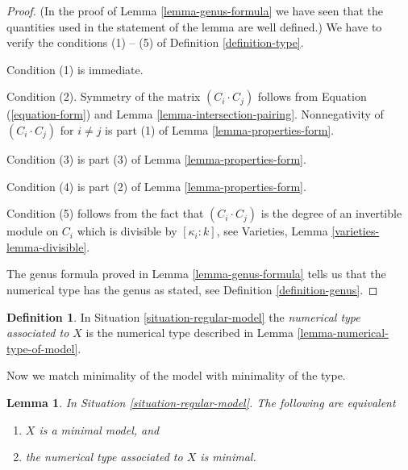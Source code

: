 \documentclass{stacks-project}
\theoremstyle{plain}
\newtheorem{lemma}[subsection]{Lemma}
\theoremstyle{definition}
\newtheorem{definition}[subsection]{Definition}
\theoremstyle{remark}
\numberwithin{equation}{subsection}
\begin{document}
\begin{proof}
(In the proof of Lemma \ref{lemma-genus-formula}
we have seen that the quantities
used in the statement of the lemma are well defined.)
We have to verify the conditions (1) -- (5) of
Definition \ref{definition-type}.

\medskip\noindent
Condition (1) is immediate.

\medskip\noindent
Condition (2). Symmetry of the matrix $(C_i \cdot C_j)$ follows from
Equation (\ref{equation-form}) and
Lemma \ref{lemma-intersection-pairing}.
Nonnegativity of $(C_i \cdot C_j)$ for $i \not = j$
is part (1) of Lemma \ref{lemma-properties-form}.

\medskip\noindent
Condition (3) is part (3) of Lemma \ref{lemma-properties-form}.

\medskip\noindent
Condition (4) is part (2) of Lemma \ref{lemma-properties-form}.

\medskip\noindent
Condition (5) follows from the fact that $(C_i \cdot C_j)$ is
the degree of an invertible module on $C_i$ which is divisible
by $[\kappa_i : k]$, see Varieties, Lemma \ref{varieties-lemma-divisible}.

\medskip\noindent
The genus formula proved in Lemma \ref{lemma-genus-formula}
tells us that the numerical type has the genus as stated, see
Definition \ref{definition-genus}.
\end{proof}

\begin{definition}
\label{definition-numerical-type-model}
In Situation \ref{situation-regular-model} the
{\it numerical type associated to $X$} is the numerical
type described in Lemma \ref{lemma-numerical-type-of-model}.
\end{definition}

\noindent
Now we match minimality of the model with minimality of the type.

\begin{lemma}
\label{lemma-numerical-type-minimal-model}
In Situation \ref{situation-regular-model}. The following
are equivalent
\begin{enumerate}
\item $X$ is a minimal model, and
\item the numerical type associated to $X$ is minimal.
\end{enumerate}
\end{lemma}
\end{document}
